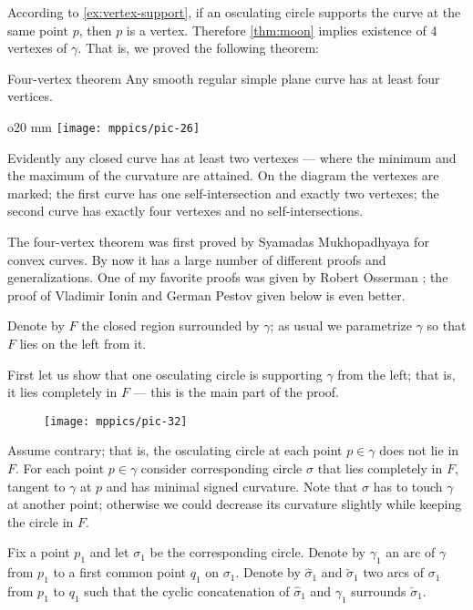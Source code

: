 According to \ref{ex:vertex-support}, if an osculating circle supports the curve at the same point $p$, then $p$ is a vertex.
Therefore \ref{thm:moon} implies existence of 4 vertexes of $\gamma$.
That is, we proved the following theorem:

\begin{thm}{Four-vertex theorem}\label{thm:4-vert}
Any smooth regular simple plane curve has at least four
vertices.
\end{thm}

\begin{wrapfigure}{o}{20 mm}
\vskip-4mm
\centering
\texttt{[image: mppics/pic-26]}
\vskip0mm
\end{wrapfigure}

Evidently any closed curve has at least two vertexes --- where the minimum and the maximum of the curvature are attained.
On the diagram the vertexes are marked;
the first curve has one self-intersection and exactly two vertexes;
the second curve has exactly four vertexes and no self-intersections.

The four-vertex theorem was first proved by Syamadas Mukhopadhyaya \cite{mukhopadhyaya} for convex curves.
By now it has a large number of different proofs and generalizations.
One of my favorite proofs was given by Robert Osserman \cite{osserman};
the proof of Vladimir Ionin and German Pestov given below is even better.

Denote by $F$ the closed region surrounded by $\gamma$;
as usual we parametrize $\gamma$ so that $F$ lies on the left from it.

First let us show that one osculating circle is supporting $\gamma$ from the left; that is, it lies completely in $F$ --- this is the main part of the proof.

\begin{figure}[h!]%
\vskip-0mm
\centering
\texttt{[image: mppics/pic-32]}
\vskip0mm
\end{figure}

Assume contrary; that is, the osculating circle at each point $p\in \gamma$ does not lie in $F$.
For each point $p\in\gamma$ consider corresponding circle $\sigma$ that lies completely in $F$, tangent to $\gamma$ at $p$ and has minimal signed curvature.
Note that $\sigma$ has to touch $\gamma$ at another point;
otherwise we could decrease its curvature slightly while keeping the circle in $F$.

Fix a point $p_1$ and let $\sigma_1$ be the corresponding circle.
Denote by $\gamma_1$ an arc of $\gamma$ from $p_1$ to a first common point $q_1$ on $\sigma_1$.
Denote by $\hat\sigma_1$ and $\check\sigma_1$ two arcs of $\sigma_1$ from $p_1$ to $q_1$ such that the cyclic concatenation of $\hat\sigma_1$ and $\gamma_1$ surrounds $\check\sigma_1$.

